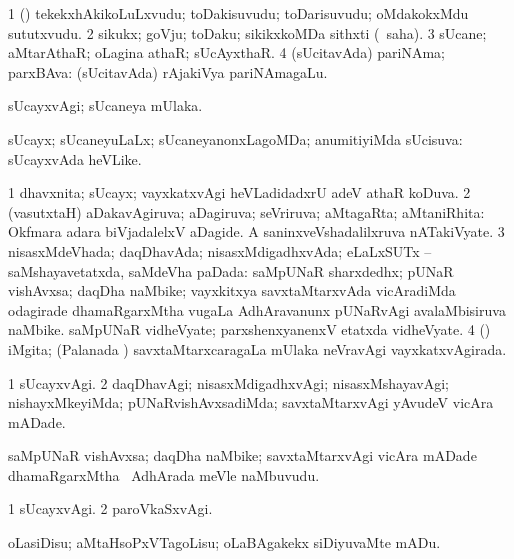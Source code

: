 \bentry
{}
\gl{\nA}
\bmng
\bnum
\num{1} (\pArxparx) tekekxhAkikoLuLxvudu; toDakisuvudu; toDarisuvudu; oMdakokxMdu sututxvudu. 
\num{2} sikukx; goVju; toDaku; sikikxkoMDa sithxti (\rUpa\ saha). 
\num{3} sUcane; aMtarAthaR; oLagina athaR; sUcAyxthaR. 
\num{4} (sUcitavAda) pariNAma; parxBAva:  (sUcitavAda) rAjakiVya pariNAmagaLu. 
\enum
\emng

\noindent
\gl{\pagu}
\bmng
{} sUcayxvAgi; sUcaneya mUlaka. 
\emng
\eentry

\bentry
{}
\gl{\gu}
\bmng
sUcayx; sUcaneyuLaLx; sUcaneyanonxLagoMDa; anumitiyiMda sUcisuva:  sUcayxvAda heVLike. 
\emng
\eentry

\bentry
{}
\gl{\gu}
\bmng
\bnum
\num{1} dhavxnita; sUcayx; vayxkatxvAgi heVLadidadxrU adeV athaR koDuva. 
\num{2} (vasutxtaH) aDakavAgiruva; aDagiruva; seVriruva; aMtagaRta; aMtaniRhita:  Okfmara adara biVjadalelxV aDagide.  A saninxveVshadalilxruva nATakiVyate. 
\num{3} nisasxMdeVhada; daqDhavAda; nisasxMdigadhxvAda; eLaLxSUTx -- saMshayavetatxda, saMdeVha paDada:  saMpUNaR sharxdedhx; pUNaR vishAvxsa; daqDha naMbike; vayxkitxya savxtaMtarxvAda vicAradiMda odagirade dhamaRgarxMtha \mo vugaLa AdhAravanunx pUNaRvAgi avalaMbisiruva naMbike.  saMpUNaR vidheVyate; parxshenxyanenxV etatxda vidheVyate. 
\num{4} (\ga) iMgita; (Palanada \vi) savxtaMtarxcaragaLa mUlaka neVravAgi vayxkatxvAgirada. 
\enum
\emng
\eentry

\bentry
{}
\gl{\kirxvi}
\bmng
\bnum
\num{1} sUcayxvAgi. 
\num{2} daqDhavAgi; nisasxMdigadhxvAgi; nisasxMshayavAgi; nishayxMkeyiMda; pUNaRvishAvxsadiMda; savxtaMtarxvAgi yAvudeV vicAra mADade. 
\enum
\emng
\eentry

\bentry
{}
\gl{\nA}
\bmng
saMpUNaR vishAvxsa; daqDha naMbike; savxtaMtarxvAgi vicAra mADade dhamaRgarxMtha \mo\ AdhArada meVle naMbuvudu. 
\emng
\eentry

\bentry
{}
\gl{\kirxvi}
\bmng
\bnum
\num{1} sUcayxvAgi. 
\num{2} paroVkaSxvAgi. 
\enum
\emng
\eentry

\bentry
{}
\gl{\sakirx}
\bmng
oLasiDisu; aMtaHsoPxVTagoLisu; oLaBAgakekx siDiyuvaMte mADu. 
\emng

